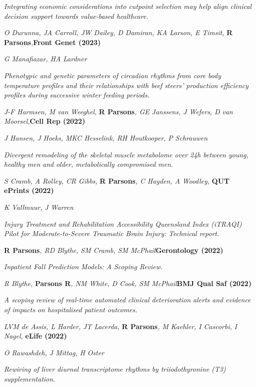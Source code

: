     \textit{Integrating economic considerations into cutpoint selection may help align clinical decision support towards value-based healthcare.}
\item
    \textit{O Durunna, JA Carroll, JW Dailey, D Damiran, KA Larson, E Timsit, }\textbf{R Parsons}\textit{,}\textbf{\hfill{Front Genet (2023)}}\par
	\textit{G Manafiazar, HA Lardner}\par
    \textit{Phenotypic and genetic parameters of circadian rhythms from core body temperature profiles and their relationships with beef steers’ production efficiency profiles during successive winter feeding periods.}
\item
    \textit{J-F Harmsen, M van Weeghel, }\textbf{R Parsons}\textit{, GE Janssens, J Wefers, D van Moorsel,}\textbf{\hfill{Cell Rep (2022)}}\par
	\textit{J Hansen, J Hoeks, MKC Hesselink, RH Houtkooper, P Schrauwen}\par
    \textit{Divergent remodeling of the skeletal muscle metabolome over 24h between young, healthy men and older, metabolically compromised men.}
\item
    \textit{S Cramb, A Rolley, CR Gibbs, }\textbf{R Parsons}\textit{, C Hayden, A Woodley, }\textbf{\hfill{QUT ePrints (2022)}}\par
	\textit{K Vallmuur, J Warren}\par
	\textit{Injury Treatment and Rehabilitation Accessibility Queensland Index (iTRAQI) Pilot for Moderate-to-Severe Traumatic Brain Injury: Technical report.}
\item
    \textbf{R Parsons}\textit{, RD Blythe, SM Cramb, SM McPhail}\textbf{\hfill Gerontology (2022)}\par
	\textit{Inpatient Fall Prediction Models: A Scoping Review.}
\item
	\textit{R Blythe, }\textbf{Parsons R}\textit{, NM White, D Cook, SM McPhail}\textbf{\hfill{BMJ Qual Saf (2022)}}\par
	\textit{A scoping review of real-time automated clinical deterioration alerts and evidence of impacts on hospitalised patient outcomes.}
\item
	\textit{LVM de Assis, L Harder, JT Lacerda, }\textbf{R Parsons}\textit{, M Kaehler, I Cascorbi, I Nagel, }\textbf{\hfill eLife (2022)}\par
	\textit{O Rawashdeh, J Mittag, H Oster}\par
    \textit{Rewiring of liver diurnal transcriptome rhythms by triiodothyronine (T3) supplementation.}
